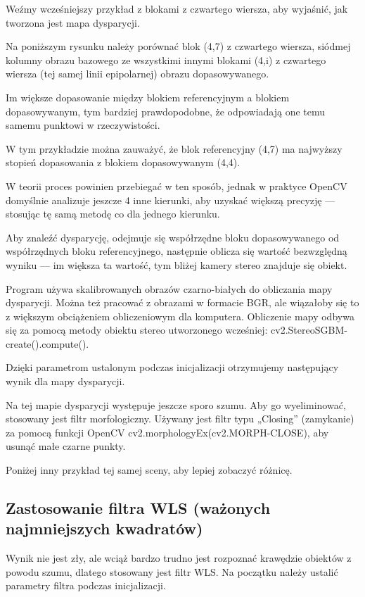 \documentclass[magisterska]{pracadypl}
\begin{document}
Weźmy wcześniejszy przykład z blokami z czwartego wiersza, aby wyjaśnić, jak tworzona jest mapa dysparycji.

Na poniższym rysunku należy porównać blok (4,7) z czwartego wiersza, siódmej kolumny obrazu bazowego ze wszystkimi innymi blokami (4,i) z czwartego wiersza (tej samej linii epipolarnej) obrazu dopasowywanego.

Im większe dopasowanie między blokiem referencyjnym a blokiem dopasowywanym, tym bardziej prawdopodobne, że odpowiadają one temu samemu punktowi w rzeczywistości.

W tym przykładzie można zauważyć, że blok referencyjny (4,7) ma najwyższy stopień dopasowania z blokiem dopasowywanym (4,4).

W teorii proces powinien przebiegać w ten sposób, jednak w praktyce OpenCV domyślnie analizuje jeszcze 4 inne kierunki, aby uzyskać większą precyzję — stosując tę samą metodę co dla jednego kierunku.

Aby znaleźć dysparycję, odejmuje się współrzędne bloku dopasowywanego od współrzędnych bloku referencyjnego, następnie oblicza się wartość bezwzględną wyniku — im większa ta wartość, tym bliżej kamery stereo znajduje się obiekt.

Program używa skalibrowanych obrazów czarno-białych do obliczania mapy dysparycji. Można też pracować z obrazami w formacie BGR, ale wiązałoby się to z większym obciążeniem obliczeniowym dla komputera. Obliczenie mapy odbywa się za pomocą metody obiektu stereo utworzonego wcześniej: cv2.StereoSGBM-create().compute().

Dzięki parametrom ustalonym podczas inicjalizacji otrzymujemy następujący wynik dla mapy dysparycji.

Na tej mapie dysparycji występuje jeszcze sporo szumu. Aby go wyeliminować, stosowany jest filtr morfologiczny. Używany jest filtr typu „Closing” (zamykanie) za pomocą funkcji OpenCV cv2.morphologyEx(cv2.MORPH-CLOSE), aby usunąć małe czarne punkty.

Poniżej inny przykład tej samej sceny, aby lepiej zobaczyć różnicę.

\subsection{Zastosowanie filtra WLS (ważonych najmniejszych kwadratów)}

Wynik nie jest zły, ale wciąż bardzo trudno jest rozpoznać krawędzie obiektów z powodu szumu, dlatego stosowany jest filtr WLS. Na początku należy ustalić parametry filtra podczas inicjalizacji.
\end{document}

